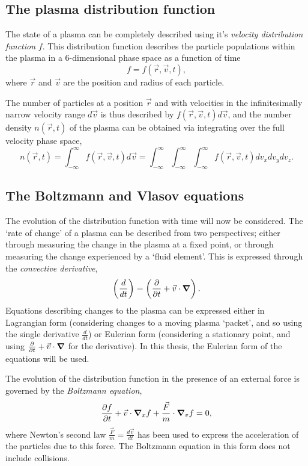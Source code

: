 \subsection{The plasma distribution function}
The state of a plasma can be completely described using it's \textit{velocity distribution function} $f$. This distribution function describes the particle populations within the plasma in a 6-dimensional phase space as a function of time
\begin{equation} f = f(\vec{r}, \vec{v}, t), \end{equation} 
where $\vec{r}$ and $\vec{v}$ are the position and radius of each particle. 

The number of particles at a position $\vec{r}$ and with velocities in the infinitesimally narrow velocity range $d\vec{v}$ is thus described by $f(\vec{r}, \vec{v}, t) d\vec{v}$, and the number density $n(\vec{r},t)$ of the plasma can be obtained via integrating over the full velocity phase space,
\begin{equation} n(\vec{r}, t) = \int^{\infty}_{-\infty} f(\vec{r}, \vec{v}, t) d\vec{v}  = \int^{\infty}_{-\infty} \int^{\infty}_{-\infty} \int^{\infty}_{-\infty} f(\vec{r}, \vec{v}, t) dv_x dv_y dv_z. \end{equation}


\subsection{The Boltzmann and Vlasov equations} \label{BoltzmannSection}

The evolution of the distribution function with time will now be considered. The `rate of change' of a plasma can be described from two perspectives; either through measuring the change in the plasma at a fixed point, or through measuring the change experienced by a `fluid element'. This is expressed through the \textit{convective derivative}, 
\begin{equation} \left(\frac{d}{dt}\right) = \left(\frac{\partial}{\partial t} + \vec{v} \cdot \grad\right). \end{equation}
Equations describing changes to the plasma can be expressed either in Lagrangian form (considering changes to a moving plasma `packet', and so using the single derivative $\frac{d}{dt}$) or Eulerian form (considering a stationary point, and using $\frac{\partial}{\partial t} + \vec{v} \cdot \grad$ for the derivative). In this thesis, the Eulerian form of the equations will be used.

The evolution of the distribution function in the presence of an external force is governed by the \textit{Boltzmann equation},
\begin{equation} \frac{\partial f}{\partial t} + \vec{v}\cdot \grad_x f + \frac{\vec{F}}{m} \cdot \grad_v f = 0, \end{equation}
where Newton's second law $\frac{\vec{F}}{m} = \frac{d\vec{v}}{dt}$ has been used to express the acceleration of the particles due to this force. The Boltzmann equation in this form does not include collisions.

